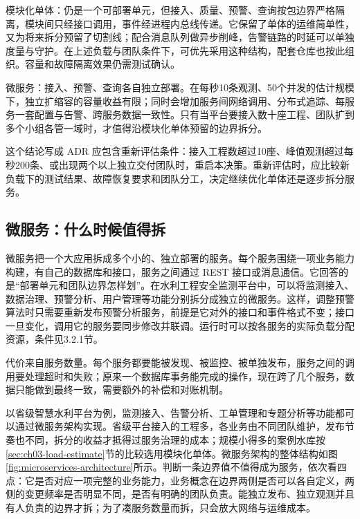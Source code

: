 模块化单体：仍是一个可部署单元，但接入、质量、预警、查询按包边界严格隔离，模块间只经接口调用，事件经进程内总线传递。它保留了单体的运维简单性，又为将来拆分预留了切割线；配合消息队列做异步削峰，告警链路的时延可以单独度量与守护。在上述负载与团队条件下，可优先采用这种结构，配套仓库也按此组织。容量和故障隔离效果仍需测试确认。

微服务：接入、预警、查询各自独立部署。在每秒10条观测、50个并发的估计规模下，独立扩缩容的容量收益有限；同时会增加服务间网络调用、分布式追踪、每服务一套配置与告警、跨服务数据一致性。只有当平台要接入数十座工程、团队扩到多个小组各管一域时，才值得沿模块化单体预留的边界拆分。

这个结论写成 ADR 应包含重新评估条件：接入工程数超过10座、峰值观测超过每秒200条、或出现两个以上独立交付团队时，重启本决策。重新评估时，应比较新负载下的测试结果、故障恢复要求和团队分工，决定继续优化单体还是逐步拆分服务。

\subsection{微服务：什么时候值得拆}

微服务把一个大应用拆成多个小的、独立部署的服务。每个服务围绕一项业务能力构建，有自己的数据库和接口，服务之间通过 REST 接口或消息通信。它回答的是“部署单元和团队边界怎样划”。在水利工程安全监测平台中，可以将监测接入、数据治理、预警分析、用户管理等功能分别拆分成独立的微服务。这样，调整预警算法时只需要重新发布预警分析服务，前提是它对外的接口和事件格式不变；接口一旦变化，调用它的服务要同步修改并联调。运行时可以按各服务的实际负载分配资源，条件见3.2.1节。

代价来自服务数量。每个服务都要能被发现、被监控、被单独发布，服务之间的调用要处理超时和失败；原来一个数据库事务能完成的操作，现在跨了几个服务，数据只能做到最终一致，需要额外的补偿和对账机制\cite{newman2021}。

以省级智慧水利平台为例，监测接入、告警分析、工单管理和专题分析等功能都可以通过微服务架构实现。省级平台接入的工程多，各业务由不同团队维护，发布节奏也不同，拆分的收益才抵得过服务治理的成本；规模小得多的案例水库按\ref{sec:ch03-load-estimate}节的比较选用模块化单体。微服务架构的整体结构如图\ref{fig:microservices-architecture}所示。判断一条边界值不值得成为服务，依次看四点：它是否对应一项完整的业务能力，业务概念在边界两侧是否可以各自定义，两侧的变更频率是否明显不同，是否有明确的团队负责。能独立发布、独立观测并且有人负责的边界才拆；为了凑服务数量而拆，只会放大网络与运维成本。

